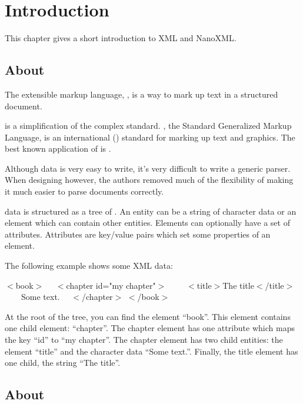 \chapter{Introduction}

This chapter gives a short introduction to XML and NanoXML.

\section{About }

The extensible markup language,
\href{http://www.w3c.org/TR/REC-xml}{}, is a way to mark up text in
a structured document.

 is a simplification of the complex  standard.
, the Standard Generalized Markup Language, is an international
() standard for marking up text and graphics.
The best known application of  is .

Although  data is very easy to write, it's very difficult to write a
generic  parser.
When designing  however, the authors removed much of the flexibility
of  making it much easier to parse  documents correctly.

 data is structured as a tree of .
An entity can be a string of character data or an element which can contain other
entities.
Elements can optionally have a set of attributes.
Attributes are key/value pairs which set some properties of an element.

The following example shows some XML data:

\begin{example}
$<$book$>$
~~$<$chapter id="my chapter"$>$
~~~~$<$title$>$The title$<$/title$>$
~~~~Some text.
~~$<$/chapter$>$
$<$/book$>$
\end{example}

At the root of the tree, you can find the element ``book''.
This element contains one child element: ``chapter''.
The chapter element has one attribute which maps the key ``id'' to
``my chapter''.
The chapter element has two child entities: the element ``title'' and the
character data ``Some text.''.
Finally, the title element has one child, the string ``The title''.

\section{About }


